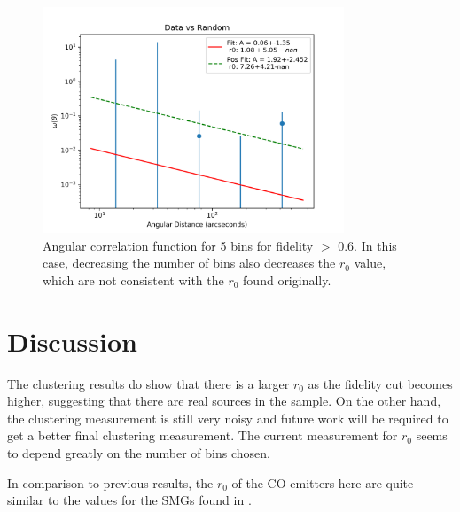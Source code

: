 \begin{figure}[!tbp]
\centering \includegraphics[width=90mm]{Data_vs_Random_10000_bin5_sn0_6_NFalse.png}
\caption{Angular correlation function for 5 bins for fidelity $>$ 0.6. In this case, decreasing the number of bins also decreases the $r_0$ value, which are not consistent with the $r_0$ found originally.}
\label{fig:Angular_bin_5}
\end{figure}

\section{Discussion}

The clustering results do show that there is a larger $r_0$ as the fidelity cut becomes higher, suggesting that there are real sources in the sample. On the other hand, the clustering measurement is still very noisy and future work will be required to get a better final clustering measurement. The current measurement for $r_0$ seems to depend greatly on the number of bins chosen. 

In comparison to previous results, the $r_0$ of the CO emitters here are quite similar to the values for the SMGs found in \cite{10.1111/j.1365-2966.2011.20303.x}.

